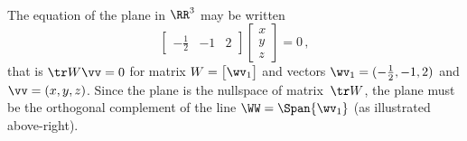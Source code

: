 \begin{example}
\begin{enumerate}[ref=\ref{eg:nulltrw}(\alph*)]
\begin{solution} \ \\
\begin{figbox}{}%
The equation of the plane in \(\RR^3\) may be written 
\begin{equation*}
\begin{bmatrix} -\tfrac12&-1&2 \end{bmatrix}
\begin{bmatrix} x\\y\\z \end{bmatrix}=0\,,
\end{equation*}
that is  \(\tr W\vv=0\)
for matrix \(W=\begin{bmatrix} \wv_1 \end{bmatrix}\) and vectors \(\wv_1=(-\tfrac12,-1,2)\) and \(\vv=(x,y,z)\).
Since the plane is the nullspace of matrix~\(\tr W\), the plane must be the orthogonal complement of the line \(\WW=\Span\{\wv_1\}\) (as illustrated above-right).
\end{figbox}
\end{solution}



\end{enumerate}
\end{example}
